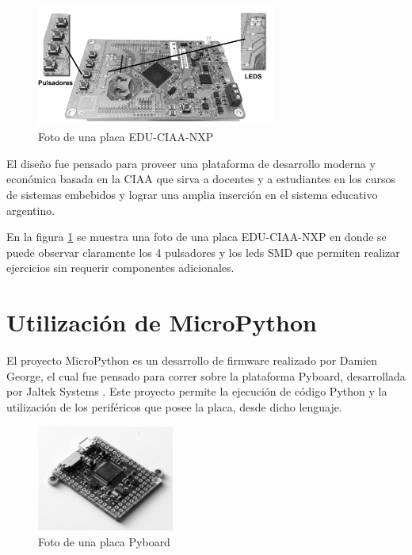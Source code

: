 \begin{figure}[ht]
  \centering
    \includegraphics[width=0.7\textwidth]{Figures/fig_educiaa_placa}
  \caption{Foto de una placa EDU-CIAA-NXP}
  \label{fig:educiaaPlaca}
\end{figure}

El diseño fue pensado para proveer una plataforma de desarrollo moderna y económica basada en la CIAA que sirva a docentes y a estudiantes en los cursos de sistemas embebidos y lograr una amplia inserción en el sistema educativo argentino.

En la figura \ref{fig:educiaaPlaca} se muestra una foto de una placa EDU-CIAA-NXP en donde se puede observar claramente los 4 pulsadores y los leds SMD que permiten realizar ejercicios sin requerir componentes adicionales.


\section{Utilización de MicroPython}
\label{sec:micropython}

El proyecto MicroPython \cite{micropython} es un desarrollo de firmware realizado por Damien George, el cual fue pensado para correr sobre la plataforma Pyboard, desarrollada por Jaltek Systems \cite{jaltek}. Este proyecto permite la ejecución de código Python y la utilización de los periféricos que posee la placa, desde dicho lenguaje.

\begin{figure}[ht]
  \centering
    \includegraphics[width=0.4\textwidth]{Figures/fig_pyboard}
  \caption{Foto de una placa Pyboard}
  \label{fig:pyboardPlaca}
\end{figure}

